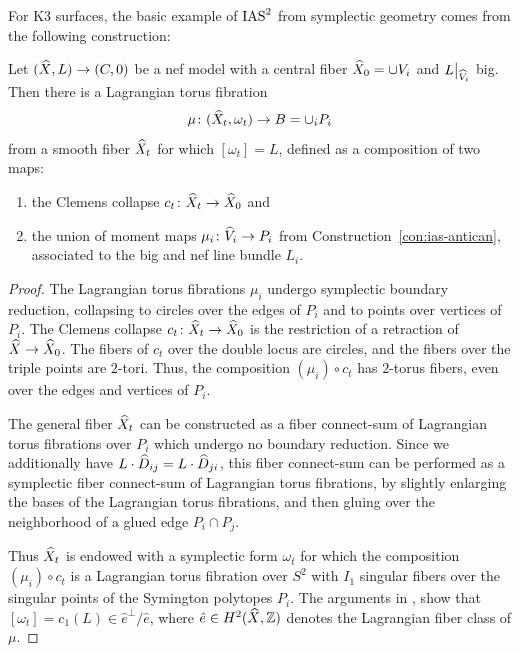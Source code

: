 \documentclass{amsart}
\begin{document}
For K3 surfaces, the basic example of
$\operatorname{IAS}^2$ from symplectic geometry comes from the following construction:


\begin{proposition}\label{def:ias-k3-symplectic}
  Let $({\widehat X},L)\to (C,0)$ be a nef model with a
  central fiber ${\widehat X}_0=\cup V_i$ and $L\big{|}_{{\widehat V}_i}$ big.
  Then there is a Lagrangian torus
  fibration $$\mu\colon ({\widehat X}_t,\omega_t)\to B=\cup_i P_i$$ from a smooth fiber ${\widehat X}_t$ 
  for which $[\omega_t]=L$, defined as a
  composition of two maps:
  \begin{enumerate}
  \item the Clemens collapse $c_t\colon {\widehat X}_t\to {\widehat X}_0$ and 
  \item the union of moment maps $\mu_i\colon {\widehat V}_i\to P_i$ from
    Construction~\ref{con:ias-antican}, associated to the big and nef
    line bundle $L_i$.
  \end{enumerate}
\end{proposition}

\begin{proof} The Lagrangian torus fibrations $\mu_i$ 
undergo symplectic boundary reduction, collapsing to circles
over the edges of $P_i$ and to points over vertices of $P_i$.
The Clemens collapse $c_t\colon {\widehat X}_t\to {\widehat X}_0$
is the restriction of a retraction of ${\widehat X}\to {\widehat X}_0$. The
fibers of $c_t$ over the double locus are circles, and the fibers
over the triple points are $2$-tori. Thus, the composition 
$(\mu_i)\circ c_t$ has $2$-torus fibers, even over the edges
and vertices of $P_i$.

The general fiber ${\widehat X}_t$ can be constructed as a fiber connect-sum
of Lagrangian torus fibrations over $P_i$ which undergo no boundary reduction.
Since we additionally have $L\cdot {\widehat D}_{ij} = L\cdot {\widehat D}_{ji}$,
this fiber connect-sum can be performed as
a symplectic fiber connect-sum of Lagrangian torus fibrations, by slightly enlarging
the bases of the Lagrangian torus fibrations, and then gluing over the neighborhood of a
glued edge $P_i\cap P_j$.

Thus ${\widehat X}_t$ is endowed with a symplectic form $\omega_t$ for which
the composition $(\mu_i)\circ c_t$ is a Lagrangian torus fibration
over $S^2$ with $I_1$ singular fibers over the singular points of the Symington
polytopes $P_i$. The arguments in \cite[Prop.~3.14]{engel2021smoothings},
\cite[Thm.~2.43]{alexeev2019stable-pair} show that $[\omega_t]=c_1(L)\in \hat{e}^\perp/\hat{e}$,
where $\hat{e}\in H^2({\widehat X},{\mathbb Z})$ denotes the Lagrangian fiber class of $\mu$.
\end{proof}
\end{document}
